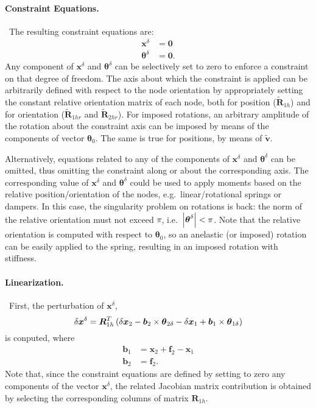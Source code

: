 \documentclass[10pt,dvips,fleqn]{report}
\newcommand{\T}[1]{\boldsymbol{#1}}
\begin{document}
\paragraph{Constraint Equations.} \
The resulting constraint equations are:
\begin{align}
	\T{x}^{\delta} &= \T{0} \\
	\T{\theta}^{\delta} &= \T{0} .
\end{align}
Any component of $\T{x}^{\delta}$ and $\T{\theta}^{\delta}$
can be selectively set to zero to enforce a constraint
on that degree of freedom.
The axis about which the constraint is applied can be arbitrarily 
defined with respect to the node orientation
by appropriately setting the constant relative orientation
matrix of each node, both for position ($\tilde{\T{R}}_{1h}$) 
and for orientation ($\tilde{\T{R}}_{1hr}$ and $\tilde{\T{R}}_{2hr}$).
For imposed rotations, an arbitrary amplitude of the rotation about 
the constraint axis can be imposed by means of the components 
of vector $\T{\theta}_0$.
The same is true for positions, by means of $\tilde{\T{v}}$. 

Alternatively, equations related to any of the components
of $\T{x}^{\delta}$ and $\T{\theta}^{\delta}$ can be omitted,
thus omitting the constraint along or about the corresponding axis.
The corresponding value of  $\T{x}^{\delta}$ and $\T{\theta}^{\delta}$ 
could be used to apply moments based on the relative position/orientation 
of the nodes, e.g.\ linear/rotational springs or dampers.
In this case, the singularity problem on rotations is back: the norm
of the relative orientation must not exceed $\pi$, i.e.\
$\shbr{\T{\theta}^{\delta}}<\pi$.
Note that the relative orientation is computed with respect to 
$\T{\theta}_0$, so an anelastic (or imposed) rotation can be easily
applied to the spring, resulting in an imposed rotation with stiffness.

\paragraph{Linearization.} \
First, the perturbation of $\T{x}^{\delta}$,
\begin{equation}
	\delta \T{x}^{\delta} = 
	\T{R}_{1h}^T\plbr{
		\delta\T{x}_2 - \T{b}_2 \times \T{\theta}_{2\delta}
		- \delta\T{x}_1 + \T{b}_1 \times \T{\theta}_{1\delta}
	}
\end{equation}
is conputed, where
\begin{align}
	\T{b}_1 &= \T{x}_2 + \T{f}_2 - \T{x}_1 \\
	\T{b}_2 &= \T{f}_2 .
\end{align}
Note that, since the constraint equations are defined by setting 
to zero any components of the vector $\T{x}^{\delta}$, the
related Jacobian matrix contribution is obtained by selecting 
the corresponding columns of matrix $\T{R}_{1h}$.
\end{document}
